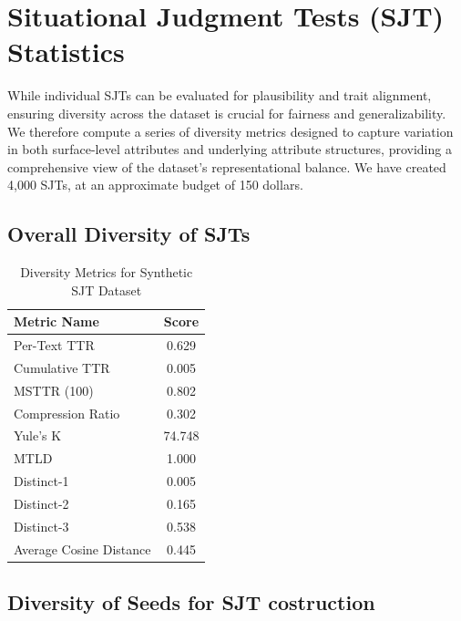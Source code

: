 \documentclass[11pt]{article}
\begin{document}
\section{Situational Judgment Tests (SJT) Statistics}
\label{sec:sjt_stats}

While individual SJTs can be evaluated for plausibility and trait alignment, ensuring diversity across the dataset is crucial for fairness and generalizability. We therefore compute a series of diversity metrics designed to capture variation in both surface-level attributes and underlying attribute structures, providing a comprehensive view of the dataset’s representational balance. We have created 4,000 SJTs, at an approximate budget of 150 dollars.


\subsection{Overall Diversity of SJTs}
\begin{table}[H]
\centering
\caption{Diversity Metrics for Synthetic SJT Dataset}
\begin{tabularx}{\columnwidth}{|X|c|}
\hline
\textbf{Metric Name} & \textbf{Score} \\
\hline
Per-Text TTR & 0.629 \\
\hline
Cumulative TTR & 0.005 \\
\hline
MSTTR (100) & 0.802 \\
\hline
Compression Ratio & 0.302 \\
\hline
Yule’s K & 74.748 \\
\hline
MTLD & 1.000 \\
\hline
Distinct-1 & 0.005 \\
\hline
Distinct-2 & 0.165 \\
\hline
Distinct-3 & 0.538 \\
\hline
Average Cosine Distance & 0.445 \\
\hline
\end{tabularx}
\end{table}

\subsection{Diversity of Seeds for SJT costruction}
\end{document}
